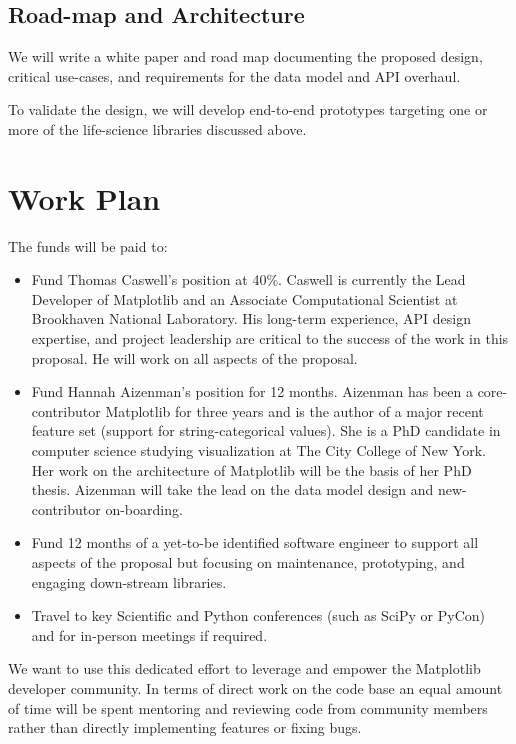 \documentclass[11pt]{article}  %
\begin{document}
\subsection{Road-map and Architecture}

We will write a white paper and road map documenting the proposed
design, critical use-cases, and requirements for the data model and
API overhaul.

To validate the design, we will develop end-to-end prototypes
targeting one or more of the life-science libraries discussed above.


\section{Work Plan}

The funds will be paid to:


\begin{itemize}[noitemsep]

\item Fund Thomas Caswell's position at 40\%.  Caswell is
  currently the Lead Developer of Matplotlib and an Associate
  Computational Scientist at Brookhaven National Laboratory.  His
  long-term experience, API design expertise, and project leadership
  are critical to the success of the work in this proposal.  He will work
  on all aspects of the proposal.
\item Fund Hannah Aizenman's position for 12 months.  Aizenman has
  been a core-contributor Matplotlib for three years and is the author
  of a major recent feature set (support for string-categorical
  values).  She is a PhD candidate in computer science studying
  visualization at The City College of New York.  Her work on the
  architecture of Matplotlib will be the basis of her PhD thesis.
  Aizenman will take the lead on the data model design and
  new-contributor on-boarding.
\item Fund 12 months of a yet-to-be identified software engineer to
  support all aspects of the proposal but focusing on maintenance,
  prototyping, and engaging down-stream libraries.
\item Travel to key Scientific and Python conferences (such as SciPy
  or PyCon) and for in-person meetings if required.
\end{itemize}

We want to use this dedicated effort to leverage and empower the
Matplotlib developer community.  In terms of direct work on the code
base an equal amount of time will be spent mentoring and reviewing
code from community members rather than directly implementing features
or fixing bugs.
\end{document}
